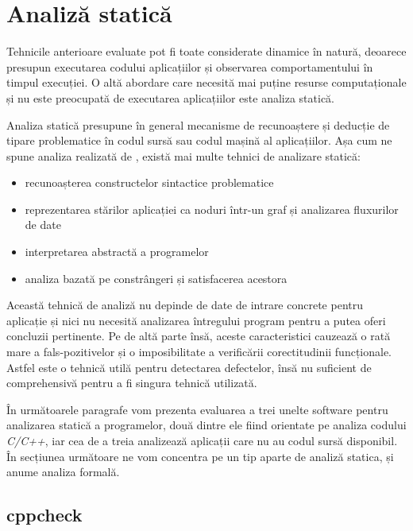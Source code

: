 
\section{Analiză statică}

Tehnicile anterioare evaluate pot fi toate considerate dinamice în natură, deoarece presupun executarea codului aplicațiilor și observarea comportamentului în timpul execuției. O altă abordare care necesită mai puține resurse computaționale și nu este preocupată de executarea aplicațiilor este analiza statică. 

Analiza statică presupune în general mecanisme de recunoaștere și deducție de tipare problematice în codul sursă sau codul mașină al aplicațiilor. Așa cum ne spune analiza realizată de \cite{Gosain2015}, există mai multe tehnici de analizare statică:
\begin{itemize}
    \item recunoașterea constructelor sintactice problematice
    \item reprezentarea stărilor aplicației ca noduri într-un graf și analizarea fluxurilor de date
    \item interpretarea abstractă a programelor
    \item analiza bazată pe constrângeri și satisfacerea acestora
\end{itemize}

Această tehnică de analiză nu depinde de date de intrare concrete pentru aplicație și nici nu necesită analizarea întregului program pentru a putea oferi concluzii pertinente. Pe de altă parte însă, aceste caracteristici cauzează o rată mare a fals-pozitivelor și o imposibilitate a verificării corectitudinii funcționale. Astfel este o tehnică utilă pentru detectarea defectelor, însă nu suficient de comprehensivă pentru a fi singura tehnică utilizată.

În următoarele paragrafe vom prezenta evaluarea a trei unelte software pentru analizarea statică a programelor, două dintre ele fiind orientate pe analiza codului \textit{C/C++}, iar cea de a treia analizează aplicații care nu au codul sursă disponibil. În secțiunea următoare ne vom concentra pe un tip aparte de analiză statica, și anume analiza formală.

\subsection{cppcheck}

